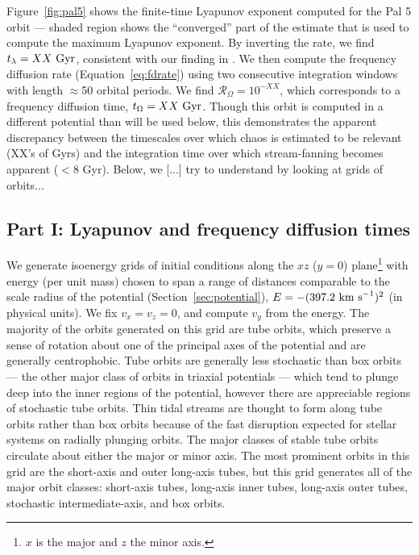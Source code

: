 \documentclass[letterpaper,12pt,preprint]{aastex}
\newcommand{\fdrate}{\mathcal{R}_\Omega}
\begin{document}
Figure~\ref{fig:pal5} shows the finite-time Lyapunov exponent computed for the Pal 5 orbit --- shaded region shows the ``converged'' part of the estimate that is used to compute the maximum Lyapunov exponent. By inverting the rate, we find $t_\lambda = XX~{\rm Gyr}$, consistent with our finding in \cite{pearson15}. We then compute the frequency diffusion rate (Equation~\ref{eq:fdrate}) using two consecutive integration windows with length $\approx$50 orbital periods. We find $\fdrate = 10^{-XX}$, which corresponds to a frequency diffusion time, $t_\Omega = XX~{\rm Gyr}$. Though this orbit is computed in a different potential than will be used below, this demonstrates the apparent discrepancy between the timescales over which chaos is estimated to be relevant (XX's of Gyrs) and the integration time over which stream-fanning becomes apparent ($<8$ Gyr). Below, we [...] try to understand by looking at grids of orbits...

\subsection{Part I: Lyapunov and frequency diffusion times}\label{sec:results1}

We generate isoenergy grids of initial conditions along the $xz$ ($y=0$) plane\footnote{$x$ is the major and $z$ the minor axis.} with energy (per unit mass) chosen to span a range of distances comparable to the scale radius of the potential (Section~\ref{sec:potential}), $E=-(397.2~{\rm km~s}^{-1})^2$ (in physical units). We fix $v_x = v_z = 0$, and compute $v_y$ from the energy. The majority of the orbits generated on this grid are tube orbits, which preserve a sense of rotation about one of the principal axes of the potential and are generally centrophobic. Tube orbits are generally less stochastic than box orbits --- the other major class of orbits in triaxial potentials --- which tend to plunge deep into the inner regions of the potential, however there are appreciable regions of stochastic tube orbits. Thin tidal streams are thought to form along tube orbits rather than box orbits because of the fast disruption expected for stellar systems on radially plunging orbits. The major classes of stable tube orbits circulate about either the major or minor axis. The most prominent orbits in this grid are the short-axis and outer long-axis tubes, but this grid generates all of the major orbit classes: short-axis tubes, long-axis inner tubes, long-axis outer tubes, stochastic intermediate-axis, and box orbits. 
\end{document}
